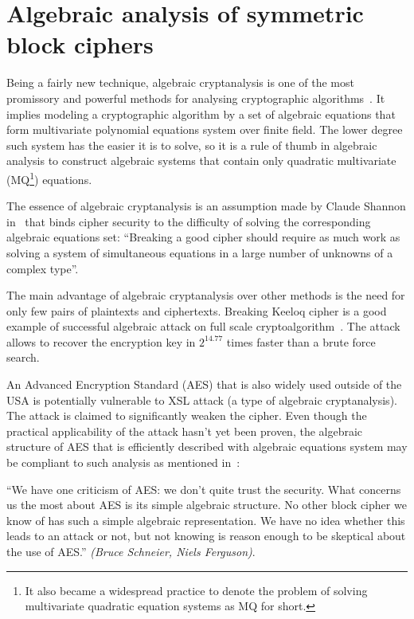 

\chapter{Algebraic analysis of symmetric block ciphers}
\label{sec:algebraic}

Being a fairly new technique, algebraic cryptanalysis is one of the most
promissory and powerful methods for analysing cryptographic
algorithms~\cite{Albrecht2010}. It implies modeling a cryptographic algorithm
by a set of algebraic equations that form multivariate polynomial equations
system over finite field. The lower degree such system has the easier it is to
solve, so it is a rule of thumb in algebraic analysis to construct algebraic
systems that contain only quadratic multivariate 
(MQ\footnote{It also became a widespread practice to denote the problem of
solving multivariate quadratic equation systems as MQ for short.}) 
equations.

The essence of algebraic cryptanalysis is an assumption made by Claude Shannon
in~\cite{shannon:secrecy} that binds cipher security to the difficulty of
solving the corresponding algebraic equations set:
``Breaking a good cipher should require as much work as solving a system of
simultaneous equations in a large number of unknowns of a complex
type''.

The main advantage of algebraic cryptanalysis over other methods is the need
for only few pairs of plaintexts and ciphertexts. Breaking Keeloq cipher is
a good example of successful algebraic attack on full scale
cryptoalgorithm~\cite{bard2009algebraic}. The attack allows to recover the
encryption key in $2^{14.77}$ times faster than a brute force search.

An Advanced Encryption Standard (AES) that is also widely used outside of the
USA is potentially vulnerable to XSL attack (a type of algebraic cryptanalysis).
The attack is claimed to significantly weaken the cipher. Even though the
practical applicability of the attack hasn't yet been proven, the algebraic 
structure of AES that is efficiently described with algebraic equations system
may be compliant to such analysis as mentioned in~\cite{ferguson2003practical}: 

``We have one criticism of AES: we don't quite trust the security. What concerns
us the most about AES is its simple algebraic structure. No other block cipher
we know of has such a simple algebraic representation. We have no idea whether
this leads to an attack or not, but not knowing is reason enough to be skeptical
about the use of AES.'' \textit{(Bruce Schneier, Niels Ferguson)}.

